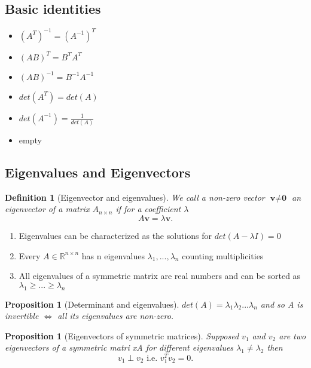 \documentclass[11pt]{article}
\newtheorem{definition}[theorem]{Definition}
\newtheorem{proposition}[theorem]{Proposition}
\begin{document}
\subsection*{Basic identities}
\begin{itemize}
    \item $(A^T)^{-1} = (A^{-1})^T$
    \item $(AB)^T = B^TA^T$
    \item $(AB)^{-1} = B^{-1}A^{-1}$
    \item $det(A^T) = det(A)$
    \item $det(A^{-1}) = \frac{1}{det(A)}$
    \item empty %
\end{itemize}

\subsection*{Eigenvalues and Eigenvectors}
\begin{definition}[Eigenvector and eigenvalues]
    We call a non-zero vector $\textbf{v} \neq \textbf{0}$ an eigenvector of a matrix $A_{n\times n}$ if for a coefficient $\lambda$
    \[
    A\textbf{v} = \lambda\textbf{v}  
    .\]    
\end{definition}
\begin{enumerate}
    \item Eigenvalues can be characterized as the solutions for $det(A- \lambda I) = 0$
    \item Every $A\in \mathbb{R}^{n\times n}$ has n eigenvalues $\lambda_1, ..., \lambda_n$ counting multiplicities
    \item All eigenvalues of a symmetric matrix are real numbers and can be sorted as $\lambda_1 \geq ... \geq \lambda_n$    
\end{enumerate}

\begin{proposition}[Determinant and eigenvalues]
    $det(A) = \lambda_1 \lambda_2 ... \lambda_n$ and so A is invertible $\Leftrightarrow$ all its eigenvalues are non-zero.  
\end{proposition}

\begin{proposition}[Eigenvectors of symmetric matrices]
    Supposed $v_1$ and $v_2$ are two eigenvectors of a symmetric matri xA for different eigenvalues $\lambda_1 \neq \lambda_2$ then
    \[
    v_1 \perp v_2 \text{ i.e. } v_1^T v_2 = 0
    .\]    
    
\end{proposition}
\end{document}
